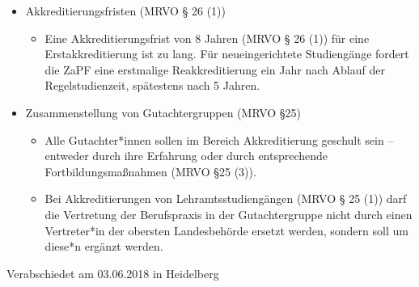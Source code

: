 \documentclass[DIV=calc]{scrartcl}
\begin{document}
\begin{itemize}
\item Akkreditierungsfristen (MRVO § 26 (1)) 
	\begin{itemize}
    \item Eine Akkreditierungsfrist von 8 Jahren (MRVO § 26 (1)) für eine Erstakkreditierung ist zu lang. Für neueingerichtete Studiengänge fordert die ZaPF eine erstmalige Reakkreditierung ein Jahr nach Ablauf der Regelstudienzeit, spätestens nach 5 Jahren.
    \end{itemize}
\item Zusammenstellung von Gutachtergruppen (MRVO §25)
	\begin{itemize}
    \item Alle Gutachter*innen sollen im Bereich Akkreditierung geschult sein -- entweder durch ihre Erfahrung oder durch entsprechende Fortbildungsmaßnahmen (MRVO §25 (3)).
    \item Bei Akkreditierungen von Lehramtsstudiengängen (MRVO § 25 (1)) darf die Vertretung der Berufspraxis in der Gutachtergruppe nicht durch einen Vertreter*in der obersten Landesbehörde ersetzt werden, sondern soll um diese*n ergänzt werden.
    \end{itemize}
\end{itemize}
\vfill
    \begin{flushright}
        Verabschiedet am 03.06.2018 in Heidelberg
    \end{flushright}
\end{document}
